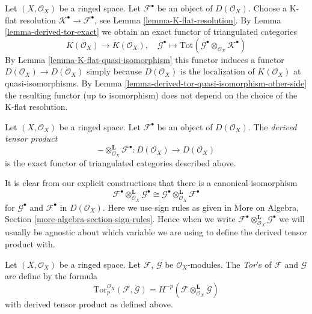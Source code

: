 \noindent
Let $(X, \mathcal{O}_X)$ be a ringed space.
Let $\mathcal{F}^\bullet$ be an object of $D(\mathcal{O}_X)$.
Choose a K-flat resolution $\mathcal{K}^\bullet \to \mathcal{F}^\bullet$, see
Lemma \ref{lemma-K-flat-resolution}.
By
Lemma \ref{lemma-derived-tor-exact}
we obtain an exact functor of triangulated categories
$$
K(\mathcal{O}_X)
\longrightarrow
K(\mathcal{O}_X),
\quad
\mathcal{G}^\bullet
\longmapsto
\text{Tot}(\mathcal{G}^\bullet \otimes_{\mathcal{O}_X} \mathcal{K}^\bullet)
$$
By
Lemma \ref{lemma-K-flat-quasi-isomorphism}
this functor induces a functor
$D(\mathcal{O}_X) \to D(\mathcal{O}_X)$ simply because
$D(\mathcal{O}_X)$ is the localization of $K(\mathcal{O}_X)$
at quasi-isomorphisms. By
Lemma \ref{lemma-derived-tor-quasi-isomorphism-other-side}
the resulting functor (up to isomorphism)
does not depend on the choice of the K-flat resolution.

\begin{definition}
\label{definition-derived-tor}
Let $(X, \mathcal{O}_X)$ be a ringed space.
Let $\mathcal{F}^\bullet$ be an object of $D(\mathcal{O}_X)$.
The {\it derived tensor product}
$$
- \otimes_{\mathcal{O}_X}^{\mathbf{L}} \mathcal{F}^\bullet :
D(\mathcal{O}_X)
\longrightarrow
D(\mathcal{O}_X)
$$
is the exact functor of triangulated categories described above.
\end{definition}

\noindent
It is clear from our explicit constructions that
there is a canonical isomorphism
$$
\mathcal{F}^\bullet \otimes_{\mathcal{O}_X}^{\mathbf{L}} \mathcal{G}^\bullet
\cong
\mathcal{G}^\bullet \otimes_{\mathcal{O}_X}^{\mathbf{L}} \mathcal{F}^\bullet
$$
for $\mathcal{G}^\bullet$ and $\mathcal{F}^\bullet$ in $D(\mathcal{O}_X)$.
Here we use sign rules as given in More on Algebra, Section
\ref{more-algebra-section-sign-rules}. Hence when we write
$\mathcal{F}^\bullet \otimes_{\mathcal{O}_X}^{\mathbf{L}} \mathcal{G}^\bullet$
we will usually be agnostic about which variable we are using to
define the derived tensor product with.

\begin{definition}
\label{definition-tor}
Let $(X, \mathcal{O}_X)$ be a ringed space.
Let $\mathcal{F}$, $\mathcal{G}$ be $\mathcal{O}_X$-modules.
The {\it Tor}'s of $\mathcal{F}$ and $\mathcal{G}$ are define by
the formula
$$
\text{Tor}_p^{\mathcal{O}_X}(\mathcal{F}, \mathcal{G}) =
H^{-p}(\mathcal{F} \otimes_{\mathcal{O}_X}^\mathbf{L} \mathcal{G})
$$
with derived tensor product as defined above.
\end{definition}

